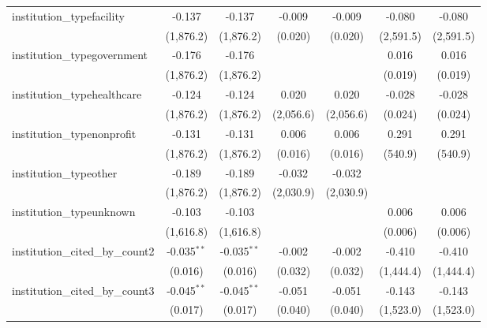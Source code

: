 \begin{tabular}{lcccccc}
   institution\_typefacility             & -0.137        & -0.137        & -0.009         & -0.009         & -0.080    & -0.080\\   
                                         & (1,876.2)     & (1,876.2)     & (0.020)        & (0.020)        & (2,591.5) & (2,591.5)\\   
   institution\_typegovernment           & -0.176        & -0.176        &                &                & 0.016     & 0.016\\   
                                         & (1,876.2)     & (1,876.2)     &                &                & (0.019)   & (0.019)\\   
   institution\_typehealthcare           & -0.124        & -0.124        & 0.020          & 0.020          & -0.028    & -0.028\\   
                                         & (1,876.2)     & (1,876.2)     & (2,056.6)      & (2,056.6)      & (0.024)   & (0.024)\\   
   institution\_typenonprofit            & -0.131        & -0.131        & 0.006          & 0.006          & 0.291     & 0.291\\   
                                         & (1,876.2)     & (1,876.2)     & (0.016)        & (0.016)        & (540.9)   & (540.9)\\   
   institution\_typeother                & -0.189        & -0.189        & -0.032         & -0.032         &           &   \\   
                                         & (1,876.2)     & (1,876.2)     & (2,030.9)      & (2,030.9)      &           &   \\   
   institution\_typeunknown              & -0.103        & -0.103        &                &                & 0.006     & 0.006\\   
                                         & (1,616.8)     & (1,616.8)     &                &                & (0.006)   & (0.006)\\   
   institution\_cited\_by\_count2        & -0.035$^{**}$ & -0.035$^{**}$ & -0.002         & -0.002         & -0.410    & -0.410\\   
                                         & (0.016)       & (0.016)       & (0.032)        & (0.032)        & (1,444.4) & (1,444.4)\\   
   institution\_cited\_by\_count3        & -0.045$^{**}$ & -0.045$^{**}$ & -0.051         & -0.051         & -0.143    & -0.143\\   
                                         & (0.017)       & (0.017)       & (0.040)        & (0.040)        & (1,523.0) & (1,523.0)\\   

\end{tabular}
